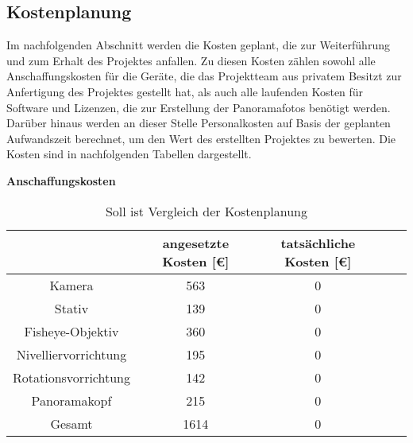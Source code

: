 \subsection{Kostenplanung}
\label{sec:Kostenplanung}

Im nachfolgenden Abschnitt werden die Kosten geplant, die zur Weiterführung und zum Erhalt des Projektes anfallen. Zu 
diesen Kosten zählen sowohl alle Anschaffungskosten für die Geräte, die das Projektteam aus privatem Besitzt zur 
Anfertigung des Projektes gestellt hat, als auch alle laufenden Kosten für Software und Lizenzen, die zur Erstellung der 
Panoramafotos benötigt werden. 
Darüber hinaus werden an dieser Stelle Personalkosten auf Basis der geplanten Aufwandszeit berechnet, um den Wert des 
erstellten Projektes zu bewerten.
Die Kosten sind in nachfolgenden Tabellen dargestellt.

\textbf{Anschaffungskosten}

\begin{table}[h]
\centering
\begin{tabular}{ccccl}
\hline
\multicolumn{1}{l}{}      & angesetzte Kosten {[}€{]} & tatsächliche Kosten {[}€{]} \\ \hline
Kamera                    & 563\footnotemark[1]           & 0                    \\ \hline
Stativ                    & 139\footnotemark[2]           & 0                    \\ \hline
Fisheye-Objektiv          & 360\footnotemark[3]           & 0                    \\ \hline
Nivelliervorrichtung      & 195\footnotemark[4]           & 0                    \\ \hline
Rotationsvorrichtung      & 142\footnotemark[5]           & 0                    \\ \hline
Panoramakopf              & 215\footnotemark[6]           & 0                    \\ \hline

Gesamt                    & 1614           & 0                    \\ \hline
\end{tabular}
\caption{Soll ist Vergleich der Kostenplanung}%
\label{tab:KostenaufstellungAnschaffung}%
\end{table}



